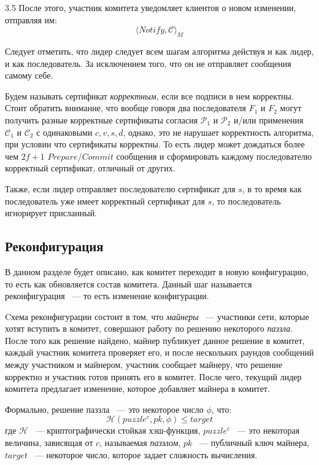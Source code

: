 3.5 После этого, участник комитета уведомляет клиентов о новом изменении, отправляя им:
 \[ \langle Notify, \mathcal{C} \rangle_M \]

Следует отметить, что лидер следует всем шагам алгоритма действуя и как лидер, и как последователь. За исключением того, что он не отправляет сообщения самому себе.

Будем называть сертификат \textit{корректным}, если все подписи в нем корректны.
Стоит обратить внимание, что вообще говоря два последователя $F_1$ и $F_2$ могут получить разные корректные сертификаты согласия $\mathcal{P}_1$ и $\mathcal{P}_2$ и/или применения $\mathcal{C}_1$ и $\mathcal{C}_2$ с одинаковыми $c, v, s, d$, однако, это не нарушает корректность алгоритма, при условии что сертификаты корректны.
То есть лидер может дождаться более чем $2f+1$ $Prepare$/$Commit$ сообщения и сформировать каждому последователю корректный сертификат, отличный от других.

Также, если лидер отправляет последователю сертификат для $s$, в то время как последователь уже имеет корректный сертификат для $s$, то последователь игнорирует присланный.

\subsection{Реконфигурация} \label{reconfig}
В данном разделе будет описано, как комитет переходит в новую конфигурацию, то есть как обновляется состав комитета. Данный шаг называется реконфигурация ~--- то есть изменение конфигурации.

Cхема реконфигурации состоит в том, что \textit{майнеры} ~--- участники сети, которые хотят вступить в комитет, совершают работу по решению некоторого \textit{паззла}. После того как решение найдено, майнер публикует данное решение в комитет, каждый участник комитета проверяет его, и после нескольких раундов сообщений между участником и майнером, участник сообщает майнеру, что решение корректно и участник готов принять его в комитет.
После чего, текущий лидер комитета предлагает изменение, которое добавляет майнера в комитет.

Формально, решение паззла ~--- это некоторое число $\phi$, что:
$$\mathcal{H}(puzzle^c, pk, \phi) \le target$$
где $\mathcal{H}$ ~--- криптографически стойкая хэш-функция, $puzzle^c$ ~--- это некоторая величина, зависящая от $c$, называемая \textit{паззлом}, $pk$ ~--- публичный ключ майнера, $target$ ~--- некоторое число, которое задает сложность вычисления.

